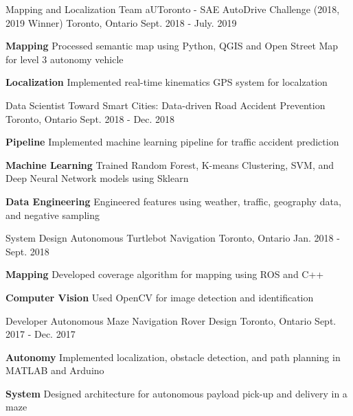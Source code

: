 \begin{cventries}
	\cventry
	{Mapping and Localization Team}
	{aUToronto - SAE AutoDrive Challenge (2018, 2019 Winner)}
	{Toronto, Ontario}
	{Sept. 2018 - July. 2019}
	{
		\begin{cvitems}
			\item {\textbf{Mapping} Processed semantic map using Python, QGIS and Open Street Map for level 3 autonomy vehicle}
			\item {\textbf{Localization} Implemented real-time kinematics GPS system for localzation}
		\end{cvitems}
	}	
	\cventry
	{Data Scientist}
	{Toward Smart Cities: Data-driven Road Accident Prevention}
	{Toronto, Ontario}
	{Sept. 2018 - Dec. 2018}
	{
		\begin{cvitems}
			\item {\textbf{Pipeline} Implemented machine learning pipeline for traffic accident prediction}
			\item {\textbf{Machine Learning} Trained Random Forest, K-means Clustering, SVM, and Deep Neural Network models using Sklearn}
			\item {\textbf{Data Engineering} Engineered features using weather, traffic, geography data, and negative sampling}
		\end{cvitems}
	}
	\cventry
	{System Design}
	{Autonomous Turtlebot Navigation}
	{Toronto, Ontario}
	{Jan. 2018 - Sept. 2018}
	{
		\begin{cvitems}
			\item {\textbf{Mapping} Developed coverage algorithm for mapping using ROS and C++}
			\item {\textbf{Computer Vision} Used OpenCV for image detection and identification}
		\end{cvitems}
	}
	\cventry
	{Developer}
	{Autonomous Maze Navigation Rover Design}
	{Toronto, Ontario}
	{Sept. 2017 - Dec. 2017}
	{
		\begin{cvitems}
			\item { \textbf{Autonomy} Implemented localization, obstacle detection, and path planning in MATLAB and Arduino}
			\item { \textbf{System} Designed architecture for autonomous payload pick-up and delivery in a maze}
		\end{cvitems}
	}
\end{cventries}

